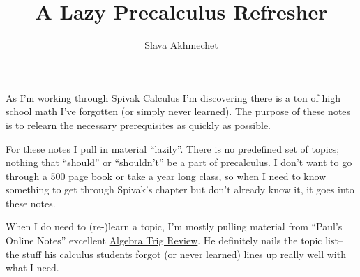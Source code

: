 \documentclass{article}
\title{A Lazy Precalculus Refresher}
\author{Slava Akhmechet}
\begin{document}
\maketitle

As I'm working through Spivak Calculus I'm discovering there is a ton
of high school math I've forgotten (or simply never learned). The
purpose of these notes is to relearn the necessary prerequisites as
quickly as possible.

\vs

For these notes I pull in material ``lazily''. There is no predefined
set of topics; nothing that ``should'' or ``shouldn't'' be a part of
precalculus. I don't want to go through a 500 page book or take a year
long class, so when I need to know something to get through Spivak's
chapter but don't already know it, it goes into these notes.

\vs

When I do need to (re-)learn a topic, I'm mostly pulling material from
``Paul's Online Notes'' excellent
\href{https://tutorial.math.lamar.edu/Extras/AlgebraTrigReview/AlgebraTrig.aspx}{Algebra
  Trig Review}. He definitely nails the topic list-- the stuff his
calculus students forgot (or never learned) lines up really well with
what I need.


\clearpage
\tableofcontents

\clearpage

\end{document}
